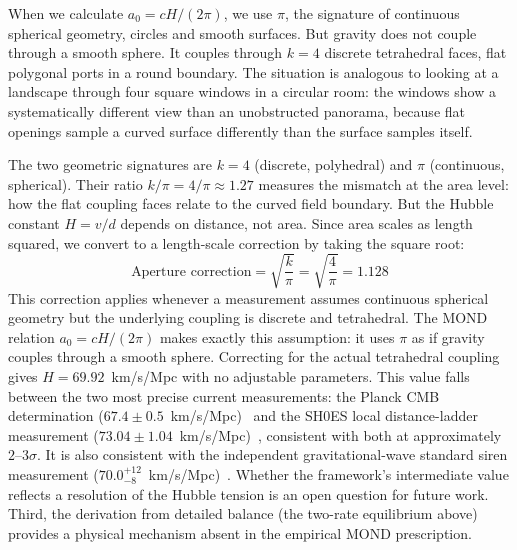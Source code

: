 \documentclass[aps,prd,preprint,superscriptaddress,showpacs,preprintnumbers,amsmath,amssymb,nofootinbib]{revtex4-2}
\begin{document}
When we calculate $a_0 = cH/(2\pi)$, we use $\pi$, the signature of continuous spherical geometry, circles and smooth surfaces. But gravity does not couple through a smooth sphere. It couples through $k = 4$ discrete tetrahedral faces, flat polygonal ports in a round boundary. The situation is analogous to looking at a landscape through four square windows in a circular room: the windows show a systematically different view than an unobstructed panorama, because flat openings sample a curved surface differently than the surface samples itself.

The two geometric signatures are $k = 4$ (discrete, polyhedral) and $\pi$ (continuous, spherical). Their ratio $k/\pi = 4/\pi \approx 1.27$ measures the mismatch at the area level: how the flat coupling faces relate to the curved field boundary. But the Hubble constant $H = v/d$ depends on distance, not area. Since area scales as length squared, we convert to a length-scale correction by taking the square root:
\begin{equation}
\text{Aperture correction} = \sqrt{\frac{k}{\pi}} = \sqrt{\frac{4}{\pi}} = 1.128
\end{equation}
This correction applies whenever a measurement assumes continuous spherical geometry but the underlying coupling is discrete and tetrahedral. The MOND relation $a_0 = cH/(2\pi)$ makes exactly this assumption: it uses $\pi$ as if gravity couples through a smooth sphere. Correcting for the actual tetrahedral coupling gives $H = 69.92$~km/s/Mpc with no adjustable parameters. This value falls between the two most precise current measurements: the Planck CMB determination ($67.4 \pm 0.5$~km/s/Mpc)~\cite{planck2020} and the SH0ES local distance-ladder measurement ($73.04 \pm 1.04$~km/s/Mpc)~\cite{riess2022}, consistent with both at approximately $2$--$3\sigma$. It is also consistent with the independent gravitational-wave standard siren measurement ($70.0^{+12}_{-8}$~km/s/Mpc)~\cite{gw170817}. Whether the framework's intermediate value reflects a resolution of the Hubble tension is an open question for future work. Third, the derivation from detailed balance (the two-rate equilibrium above) provides a physical mechanism absent in the empirical MOND prescription.
\end{document}
